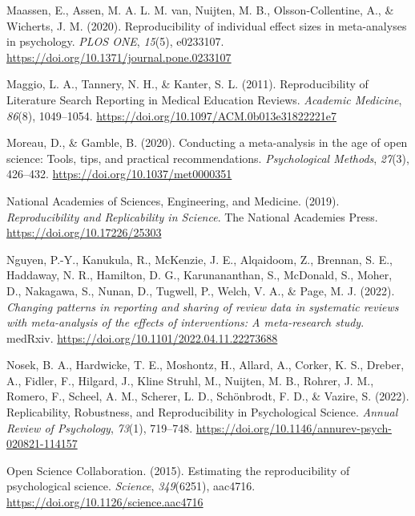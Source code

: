 \documentclass[
  ,apa7,floatsintext]{apa6}
\newlength{\cslhangindent}
\newlength{\cslentryspacingunit} %
\newenvironment{CSLReferences}[2] %
 {%
  \setlength{\parindent}{0pt}
  \ifodd #1
  \let\oldpar\par
  \def\par{\hangindent=\cslhangindent\oldpar}
  \fi
  \setlength{\parskip}{#2\cslentryspacingunit}
 }%
 {}
\begin{document}
\begin{CSLReferences}{1}{0}
\leavevmode{}%
Maassen, E., Assen, M. A. L. M. van, Nuijten, M. B., Olsson-Collentine, A., \& Wicherts, J. M. (2020). Reproducibility of individual effect sizes in meta-analyses in psychology. \emph{PLOS ONE}, \emph{15}(5), e0233107. \url{https://doi.org/10.1371/journal.pone.0233107}

\leavevmode{}%
Maggio, L. A., Tannery, N. H., \& Kanter, S. L. (2011). Reproducibility of {Literature} {Search} {Reporting} in {Medical} {Education} {Reviews}. \emph{Academic Medicine}, \emph{86}(8), 1049--1054. \url{https://doi.org/10.1097/ACM.0b013e31822221e7}

\leavevmode{}%
Moreau, D., \& Gamble, B. (2020). Conducting a meta-analysis in the age of open science: Tools, tips, and practical recommendations. \emph{Psychological Methods}, \emph{27}(3), 426--432. \url{https://doi.org/10.1037/met0000351}

\leavevmode{}%
National Academies of Sciences, Engineering, and Medicine. (2019). \emph{Reproducibility and {Replicability} in {Science}}. {The National Academies Press}. \url{https://doi.org/10.17226/25303}

\leavevmode{}%
Nguyen, P.-Y., Kanukula, R., McKenzie, J. E., Alqaidoom, Z., Brennan, S. E., Haddaway, N. R., Hamilton, D. G., Karunananthan, S., McDonald, S., Moher, D., Nakagawa, S., Nunan, D., Tugwell, P., Welch, V. A., \& Page, M. J. (2022). \emph{Changing patterns in reporting and sharing of review data in systematic reviews with meta-analysis of the effects of interventions: A meta-research study}. medRxiv. \url{https://doi.org/10.1101/2022.04.11.22273688}

\leavevmode{}%
Nosek, B. A., Hardwicke, T. E., Moshontz, H., Allard, A., Corker, K. S., Dreber, A., Fidler, F., Hilgard, J., Kline Struhl, M., Nuijten, M. B., Rohrer, J. M., Romero, F., Scheel, A. M., Scherer, L. D., Schönbrodt, F. D., \& Vazire, S. (2022). Replicability, {Robustness}, and {Reproducibility} in {Psychological Science}. \emph{Annual Review of Psychology}, \emph{73}(1), 719--748. \url{https://doi.org/10.1146/annurev-psych-020821-114157}

\leavevmode{}%
Open Science Collaboration. (2015). Estimating the reproducibility of psychological science. \emph{Science}, \emph{349}(6251), aac4716. \url{https://doi.org/10.1126/science.aac4716}


\end{CSLReferences}
\end{document}
